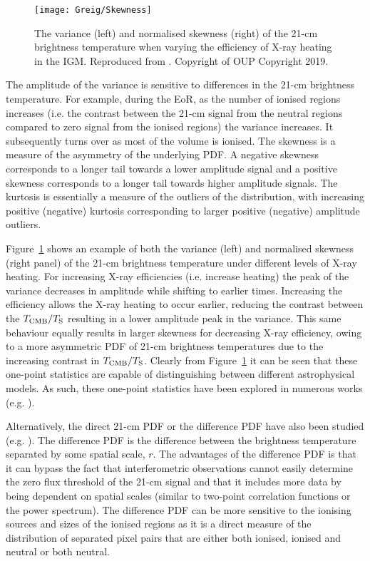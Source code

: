 \begin{figure}[]
\begin{center}
\texttt{[image: Greig/Skewness]}
\end{center}
\caption{The variance (left) and normalised skewness (right) of the 21-cm brightness temperature when varying the efficiency of X-ray heating in the IGM. Reproduced from \cite{Watkinson:2015}. Copyright of OUP Copyright 2019.}
\label{fig:skewness}
\end{figure}

The amplitude of the variance is sensitive to differences in the 21-cm brightness temperature. For example, during the EoR, as the number of ionised regions increases (i.e. the contrast between the 21-cm signal from the neutral regions compared to zero signal from the ionised regions) the variance increases. It subsequently turns over as most of the volume is ionised. The skewness is a measure of the asymmetry of the underlying PDF. A negative skewness corresponds to a longer tail towards a lower amplitude signal and a positive skewness corresponds to a longer tail towards higher amplitude signals. The kurtosis is essentially a measure of the outliers of the distribution, with increasing positive (negative) kurtosis corresponding to larger positive (negative) amplitude outliers.

Figure~\ref{fig:skewness} shows an example of both the variance (left) and normalised skewness (right panel) of the 21-cm brightness temperature under different levels of X-ray heating. For increasing X-ray efficiencies (i.e. increase heating) the peak of the variance decreases in amplitude while shifting to earlier times. Increasing the efficiency allows the X-ray heating to occur earlier, reducing the contrast between the $T_{\rm CMB}/T_{\rm S}$ resulting in a lower amplitude peak in the variance. This same behaviour equally results in larger skewness for decreasing X-ray efficiency, owing to a more asymmetric PDF of 21-cm brightness temperatures due to the increasing contrast in $T_{\rm CMB}/T_{\rm S}$. Clearly from Figure~\ref{fig:skewness} it can be seen that these one-point statistics are capable of distinguishing between different astrophysical models. As such, these one-point statistics have been explored in numerous works (e.g. \cite{Wyithe:2007b,Harker:2009,Patil:2014,Watkinson:2014,Watkinson:2015,Kittiwisit:2016,Kubota:2016,Watkinson:2015b,Shimabukuro:2015,Ross:2017}).

Alternatively, the direct 21-cm PDF or the difference PDF have also been studied (e.g. \cite{Barkana:2008,Gluscevic:2010,Ichikawa:2010,Pan:2012}). The difference PDF is the difference between the brightness temperature separated by some spatial scale, $r$. The advantages of the difference PDF is that it can bypass the fact that interferometric observations cannot easily determine the zero flux threshold of the 21-cm signal and that it includes more data by being dependent on spatial scales (similar to two-point correlation functions or the power spectrum). The difference PDF can be more sensitive to the ionising sources and sizes of the ionised regions as it is a direct measure of the distribution of separated pixel pairs that are either both ionised, ionised and neutral or both neutral.

